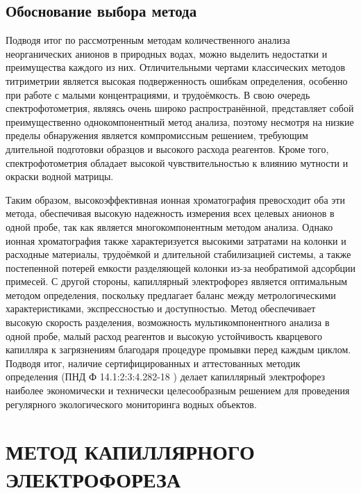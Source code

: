 \subsection{Обоснование выбора метода}

Подводя итог по рассмотренным методам количественного анализа неорганических анионов в природных водах, можно выделить недостатки и преимущества каждого из них. Отличительными чертами классических методов титриметрии является высокая подверженность ошибкам определения, особенно при работе с малыми концентрациями, и трудоёмкость. В свою очередь спектрофотометрия, являясь очень широко распространённой, представляет собой преимущественно однокомпонентный метод анализа, поэтому несмотря на низкие пределы обнаружения является компромиссным решением, требующим длительной подготовки образцов и высокого расхода реагентов. Кроме того, спектрофотометрия обладает высокой чувствительностью к влиянию мутности и окраски водной матрицы.

Таким образом, высокоэффективная ионная хроматография превосходит оба эти метода, обеспечивая высокую надежность измерения всех целевых анионов в одной пробе, так как является многокомпонентным методом анализа. Однако ионная хроматография также характеризуется высокими затратами на колонки и расходные материалы, трудоёмкой и длительной стабилизацией системы, а также постепенной потерей емкости разделяющей колонки из-за необратимой адсорбции примесей. С другой стороны, капиллярный электрофорез является оптимальным методом определения, поскольку предлагает баланс между метрологическими характеристиками, экспрессностью и доступностью. Метод обеспечивает высокую скорость разделения, возможность мультикомпонентного анализа в одной пробе, малый расход реагентов и высокую устойчивость кварцевого капилляра к загрязнениям благодаря процедуре промывки перед каждым циклом. Подводя итог, наличие сертифицированных и аттестованных методик определения (ПНД Ф 14.1:2:3:4.282-18 \cite{pndf14123428218}) делает капиллярный электрофорез наиболее экономически и технически целесообразным решением для проведения регулярного экологического мониторинга водных объектов.


\section{МЕТОД КАПИЛЛЯРНОГО ЭЛЕКТРОФОРЕЗА}

